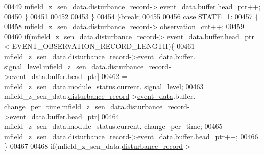 \begin{DoxyCode}
00449                     mfield\_z\_sen\_data.\hyperlink{a00027_ac9b38e2c1d3f1013a88d33506c754152}{disturbance\_record}->
      \hyperlink{a00028_a8c0bda69e71ef674e60da47ad0be9ab0}{event\_data}.buffer.head\_ptr++;
00450                     \}
00451 
00452 
00453             \}
00454         \}\textcolor{keywordflow}{break};
00455 
00456          \textcolor{keywordflow}{case} \hyperlink{a00021_a727351838367f27ac0adb9a13422c342}{STATE\_1}:
00457         \{
00458              mfield\_z\_sen\_data.\hyperlink{a00027_ac9b38e2c1d3f1013a88d33506c754152}{disturbance\_record}->
      \hyperlink{a00028_ad5b0bac02ce266b91b2b52a1c3ea1d78}{observation\_cnt}++;
00459 
00460             \textcolor{keywordflow}{if}(mfield\_z\_sen\_data.\hyperlink{a00027_ac9b38e2c1d3f1013a88d33506c754152}{disturbance\_record}->
      \hyperlink{a00028_a8c0bda69e71ef674e60da47ad0be9ab0}{event\_data}.buffer.head\_ptr < EVENT\_OBSERVATION\_RECORD\_LENGTH)\{
00461             mfield\_z\_sen\_data.\hyperlink{a00027_ac9b38e2c1d3f1013a88d33506c754152}{disturbance\_record}->\hyperlink{a00028_a8c0bda69e71ef674e60da47ad0be9ab0}{event\_data}.buffer.
      signal\_level[mfield\_z\_sen\_data.\hyperlink{a00027_ac9b38e2c1d3f1013a88d33506c754152}{disturbance\_record}->\hyperlink{a00028_a8c0bda69e71ef674e60da47ad0be9ab0}{event\_data}.buffer.head\_ptr]
00462                     = mfield\_z\_sen\_data.\hyperlink{a00027_adfab5a5d8b45a93dfb13edb24e2b80e3}{module\_status}.\hyperlink{a00019_acf41ffc11da291c2f9f0fcb02ee72b98}{current}.
      \hyperlink{a00019_a4070db8eab0ff93e3fbc1df59872f117}{signal\_level};
00463             mfield\_z\_sen\_data.\hyperlink{a00027_ac9b38e2c1d3f1013a88d33506c754152}{disturbance\_record}->\hyperlink{a00028_a8c0bda69e71ef674e60da47ad0be9ab0}{event\_data}.buffer.
      change\_per\_time[mfield\_z\_sen\_data.\hyperlink{a00027_ac9b38e2c1d3f1013a88d33506c754152}{disturbance\_record}->\hyperlink{a00028_a8c0bda69e71ef674e60da47ad0be9ab0}{event\_data}.buffer.head\_ptr]
00464                     = mfield\_z\_sen\_data.\hyperlink{a00027_adfab5a5d8b45a93dfb13edb24e2b80e3}{module\_status}.\hyperlink{a00019_acf41ffc11da291c2f9f0fcb02ee72b98}{current}.
      \hyperlink{a00019_a0f645dd76b41adc6a966feba8e4bff8c}{change\_per\_time};
00465             mfield\_z\_sen\_data.\hyperlink{a00027_ac9b38e2c1d3f1013a88d33506c754152}{disturbance\_record}->\hyperlink{a00028_a8c0bda69e71ef674e60da47ad0be9ab0}{event\_data}.buffer.head\_ptr++;
00466             \}
00467 
00468              \textcolor{keywordflow}{if}(mfield\_z\_sen\_data.\hyperlink{a00027_ac9b38e2c1d3f1013a88d33506c754152}{disturbance\_record}->

\end{DoxyCode}
